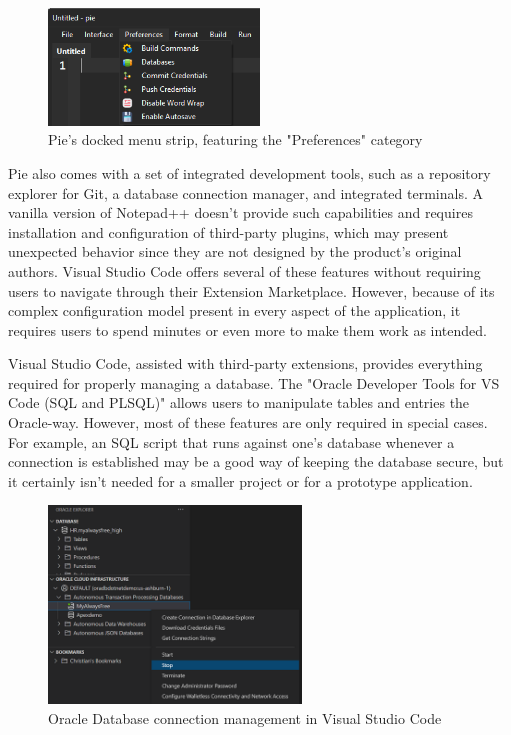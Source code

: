 \begin{figure}[h]
\centering
\includegraphics[width=0.5\textwidth]{images/pie-menu-strip.png}
\caption{Pie's docked menu strip, featuring the "Preferences" category}
\label{fig:fig2,1.}
\end{figure}

Pie also comes with a set of integrated development tools, such as a repository explorer for Git, a database connection manager, and integrated terminals. A vanilla version of Notepad++ doesn't provide such capabilities and requires installation and configuration of third-party plugins, which may present unexpected behavior since they are not designed by the product's original authors. Visual Studio Code offers several of these features without requiring users to navigate through their Extension Marketplace. However, because of its complex configuration model present in every aspect of the application, it requires users to spend minutes or even more to make them work as intended.

Visual Studio Code, assisted with third-party extensions, provides everything required for properly managing a database. The "Oracle Developer Tools for VS Code (SQL and PLSQL)" allows users to manipulate tables and entries the Oracle-way. However, most of these features are only required in special cases. For example, an SQL script that runs against one's database whenever a connection is established may be a good way of keeping the database secure, but it certainly isn't needed for a smaller project or for a prototype application.

\begin{figure}[h]
\centering
\includegraphics[width=0.6\textwidth]{images/oracledb-vscode.png}
\caption{Oracle Database connection management in Visual Studio Code}
\label{fig:fig2,1.}
\end{figure}

